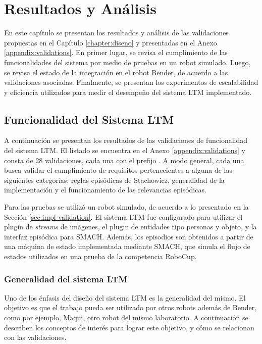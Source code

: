 \chapter{Resultados y Análisis}\label{chapter:results}
\newcommand\graphwidth{0.65}

En este capítulo se presentan los resultados y análisis de las validaciones propuestas en el Capítulo \ref{chapter:diseno} y presentadas en el Anexo \ref{appendix:validations}. En primer lugar, se revisa el cumplimiento de las funcionalidades del sistema por medio de pruebas en un robot simulado. Luego, se revisa el estado de la integración en el robot Bender, de acuerdo a las validaciones asociadas. Finalmente, se presentan los experimentos de escalabilidad y eficiencia utilizados para medir el desempeño del sistema LTM implementado.


\section{Funcionalidad del Sistema LTM}

A continuación se presentan los resultados de las validaciones de funcionalidad del sistema LTM. El listado se encuentra en el Anexo \ref{appendix:validations} y consta de 28 validaciones, cada una con el prefijo . A modo general, cada una busca validar el cumplimiento de requisitos pertenecientes a alguna de las siguientes categorías: reglas episódicas de Stachowicz, generalidad de la implementación y el funcionamiento de las relevancias episódicas.

Para las pruebas se utilizó un robot simulado, de acuerdo a lo presentado en la Sección \ref{sec:impl-validation}. El sistema LTM fue configurado para utilizar el plugin de \textit{streams} de imágenes, el plugin de entidades tipo personas y objeto, y la interfaz episódica para SMACH. Además, los episodios son obtenidos a partir de una máquina de estado implementada mediante SMACH, que simula el flujo de estados utilizados en una prueba de la competencia RoboCup.

\subsection{Generalidad del sistema LTM}

Uno de los énfasis del diseño del sistema LTM es la generalidad del mismo. El objetivo es que el trabajo pueda ser utilizado por otros robots además de Bender, como por ejemplo, Maqui, otro robot del mismo laboratorio. A continuación se describen los conceptos de interés para lograr este objetivo, y cómo se relacionan con las validaciones.

